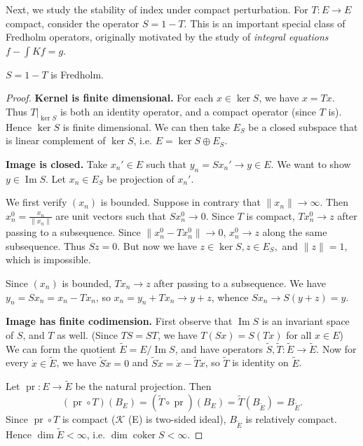 Next, we study the stability of index under compact perturbation.
For $T: E \to E$ compact, consider the operator $S = 1 - T$. This is an important special class of Fredholm operators, originally motivated by the study of \textit{integral equations} $f - \int K f = g$.

\begin{theorem}
	\label{thm:ITFredholm}
	$S = 1 - T$ is Fredholm.
\end{theorem}
\begin{proof}
	\textbf{Kernel is finite dimensional.} For each $x \in \operatorname{ker} S$, we have $x = T x$. Thus $T|_{\operatorname{ker} S}$ is both an identity operator, and a compact operator (since $T$ is). Hence $\operatorname{ker} S$ is finite dimensional. We can then take $E_S$ be a closed subspace that is linear complement of $\operatorname{ker} S$, i.e. $E = \operatorname{ker}  S \oplus E_S$.

	\textbf{Image is closed.} Take $x_n' \in E$ such that $y_n = S x_n' \to y \in E$. We want to show $y \in \operatorname{Im} S$. Let $x_n \in E_S$ be projection of $x_n'$.

	We first verify $(x_n)$ is bounded. Suppose in contrary that $\|x_n\| \to \infty $. Then $x_n^0 = \frac{x_n}{\|x_n\|}$ are unit vectors such that $S x_n^0 \to 0$. Since $T$ is compact, $T x_n^0 \to z$ after passing to a subsequence. Since $\|x_n^0 - T x_n^0\| \to 0$, $x_n^0 \to z$ along the same subsequence. Thus $S z = 0$. But now we have  $z \in \operatorname{ker} S, z \in E_S, $ and $\|z\| = 1$, which is impossible.

	Since $(x_n)$ is bounded, $T x_n \to z$ after passing to a subsequence. We have $y_n = S x_n = x_n - T x_n$, so $x_n = y_n + T x_n \to y + z$, whence $S x_n \to S(y + z) = y$.

	\textbf{Image has finite codimension.} First observe that $\operatorname{Im} S$ is an invariant space of $S$, and $T$ as well. (Since $T S = S T$, we have $T (S x) = S(T x)$ for all $x \in E$) 
	We can form the quotient $\tilde E = E / \operatorname{Im} S$, and have operators $\tilde S, \tilde T: \tilde E \to \tilde E$. Now for every $\dot{x} \in \tilde E$, we have $\tilde S \dot{x} = 0$ and $\tilde S \dot{x} = \dot{x} - \tilde T \dot{x}$, so $\tilde T$ is identity on $\tilde E$.

	Let $\operatorname{pr} : E \to \tilde E$ be the natural projection. Then
	\[
		(\operatorname{pr}  \circ T)(B_E) = (\tilde T \circ \operatorname{pr} )(B_E) = \tilde T (B_{\tilde E}) = B_{\tilde E}
	.\] 
	Since $\operatorname{pr }  \circ T$ is compact ($\mathcal{K}$ (E) is two-sided ideal), $B_{\tilde E}$ is relatively compact. Hence $\operatorname{dim} \tilde E < \infty $, i.e. $\operatorname{dim} \operatorname{coker} S < \infty $.
\end{proof}

